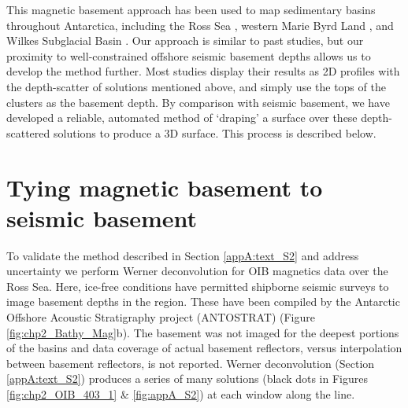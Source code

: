 This magnetic basement approach has been used to map sedimentary basins throughout Antarctica, including the Ross Sea \citep{karnergravity2005}, western Marie Byrd Land \citep{bellidentifying2006}, and Wilkes Subglacial Basin \citep{studingersubice2004, frederickdistribution2016}. Our approach is similar to past studies, but our proximity to well-constrained offshore seismic basement depths \citep{brancolinidescriptive1995} allows us to develop the method further. Most studies display their results as 2D profiles with the depth-scatter of solutions mentioned above, and simply use the tops of the clusters as the basement depth. By comparison with seismic basement, we have developed a reliable, automated method of ‘draping’ a surface over these depth-scattered solutions to produce a 3D surface. This process is described below.

\section{Tying magnetic basement to seismic basement} \label{appA:text_S3}
To validate the method described in Section \ref{appA:text_S2} and address uncertainty we perform Werner deconvolution for OIB magnetics data \citep[Figure \ref{fig:chp2_Bathy_Mag}b,][]{cochranicebridge2014} over the Ross Sea. Here, ice-free conditions have permitted shipborne seismic surveys to image basement depths in the region. These have been compiled by the Antarctic Offshore Acoustic Stratigraphy project (ANTOSTRAT) \citep{brancolinidescriptive1995} (Figure \ref{fig:chp2_Bathy_Mag}b). The basement was not imaged for the deepest portions of the basins and data coverage of actual basement reflectors, versus interpolation between basement reflectors, is not reported. Werner deconvolution (Section \ref{appA:text_S2}) produces a series of many solutions (black dots in Figures \ref{fig:chp2_OIB_403_1} \& \ref{fig:appA_S2}) at each window along the line.\\

